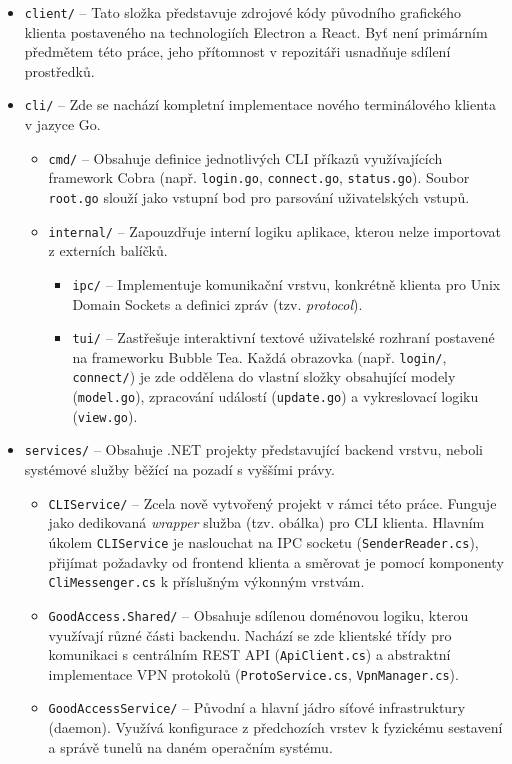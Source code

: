 \begin{itemize}
    \item \texttt{client/} -- Tato složka představuje zdrojové kódy původního grafického klienta postaveného na technologiích Electron a React. Byť není primárním předmětem této práce, jeho přítomnost v repozitáři usnadňuje sdílení prostředků.
    
    \item \texttt{cli/} -- Zde se nachází kompletní implementace nového terminálového klienta v jazyce Go.
    \begin{itemize}
        \item \texttt{cmd/} -- Obsahuje definice jednotlivých CLI příkazů využívajících framework Cobra (např. \texttt{login.go}, \texttt{connect.go}, \texttt{status.go}). Soubor \texttt{root.go} slouží jako vstupní bod pro parsování uživatelských vstupů.
        \item \texttt{internal/} -- Zapouzdřuje interní logiku aplikace, kterou nelze importovat z externích balíčků.
        \begin{itemize}
            \item \texttt{ipc/} -- Implementuje komunikační vrstvu, konkrétně klienta pro Unix Domain Sockets a definici zpráv (tzv. \textit{protocol}).
            \item \texttt{tui/} -- Zastřešuje interaktivní textové uživatelské rozhraní postavené na frameworku Bubble Tea. Každá obrazovka (např. \texttt{login/}, \texttt{connect/}) je zde oddělena do vlastní složky obsahující modely (\texttt{model.go}), zpracování událostí (\texttt{update.go}) a vykreslovací logiku (\texttt{view.go}).
        \end{itemize}
    \end{itemize}

    \item \texttt{services/} -- Obsahuje .NET projekty představující backend vrstvu, neboli systémové služby běžící na pozadí s vyššími právy.
    \begin{itemize}
        \item \texttt{CLIService/} -- Zcela nově vytvořený projekt v rámci této práce. Funguje jako dedikovaná \textit{wrapper} služba (tzv. obálka) pro CLI klienta. Hlavním úkolem \texttt{CLIService} je naslouchat na IPC socketu (\texttt{SenderReader.cs}), přijímat požadavky od frontend klienta a směrovat je pomocí komponenty \texttt{CliMessenger.cs} k příslušným výkonným vrstvám.
        \item \texttt{GoodAccess.Shared/} -- Obsahuje sdílenou doménovou logiku, kterou využívají různé části backendu. Nachází se zde klientské třídy pro komunikaci s centrálním REST API (\texttt{ApiClient.cs}) a abstraktní implementace VPN protokolů (\texttt{ProtoService.cs}, \texttt{VpnManager.cs}).
        \item \texttt{GoodAccessService/} -- Původní a hlavní jádro síťové infrastruktury (daemon). Využívá konfigurace z předchozích vrstev k fyzickému sestavení a správě tunelů na daném operačním systému.
    \end{itemize}
\end{itemize}

